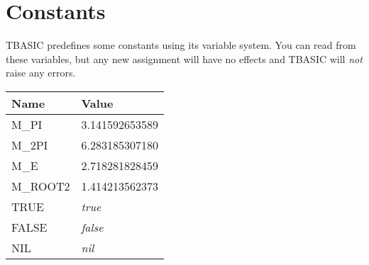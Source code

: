\section{Constants}

TBASIC predefines some constants using its variable system. You can read from these variables, but any new assignment will have no effects and TBASIC will \emph{not} raise any errors.

\begin{tabularx}{\textwidth}{l X}
	\textbf{Name} & \textbf{Value}
	\\
	\endhead
	M\_PI    & 3.141592653589 \\
	M\_2PI   & 6.283185307180 \\
	M\_E     & 2.718281828459 \\
	M\_ROOT2 & 1.414213562373 \\
	TRUE    & \emph{true} \\
	FALSE   & \emph{false} \\
	NIL     & \emph{nil} \\
\end{tabularx}
